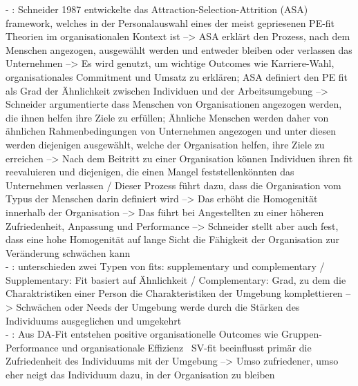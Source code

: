 - \cite[S. 4]{su:2015}: Schneider 1987 entwickelte das Attraction-Selection-Attrition (ASA) framework, welches in der Personalauswahl eines der meist gepriesenen PE-fit Theorien im organisationalen Kontext ist --> ASA erklärt den Prozess, nach dem Menschen angezogen, ausgewählt werden und entweder bleiben oder verlassen das Unternehmen --> Es wird genutzt, um wichtige Outcomes wie Karriere-Wahl, organisationales Commitment und Umsatz zu erklären; ASA definiert den PE fit als Grad der Ähnlichkeit zwischen Individuen und der Arbeitsumgebung --> Schneider argumentierte dass Menschen von Organisationen angezogen werden, die ihnen helfen ihre Ziele zu erfüllen; Ähnliche Menschen werden daher von ähnlichen Rahmenbedingungen von Unternehmen angezogen und unter diesen werden diejenigen ausgewählt, welche der Organisation helfen, ihre Ziele zu erreichen --> Nach dem Beitritt zu einer Organisation können Individuen ihren fit reevaluieren und diejenigen, die einen Mangel feststellenkönnten das Unternehmen verlassen / Dieser Prozess führt dazu, dass die Organisation vom Typus der Menschen darin definiert wird --> Das erhöht die Homogenität innerhalb der Organisation --> Das führt bei Angestellten zu einer höheren Zufriedenheit, Anpassung und Performance --> Schneider stellt aber auch fest, dass eine hohe Homogenität auf lange Sicht die Fähigkeit der Organisation zur Veränderung schwächen kann \\
- \cite[S. 6]{su:2015}: \textcite{muchinsky:1987} unterschieden zwei Typen von fits: supplementary und complementary / Supplementary: Fit basiert auf Ähnlichkeit / Complementary: Grad, zu dem die Charaktristiken einer Person die Charakteristiken der Umgebung komplettieren --> Schwächen oder Needs der Umgebung werde durch die Stärken des Individuums ausgeglichen und umgekehrt \\
- \cite{su:2015}: Aus DA-Fit entstehen positive organisationelle Outcomes wie Gruppen-Performance und organisationale Effizienz \ SV-fit beeinflusst primär die Zufriedenheit des Individuums mit der Umgebung --> Umso zufriedener, umso eher neigt das Individuum dazu, in der Organisation zu bleiben

